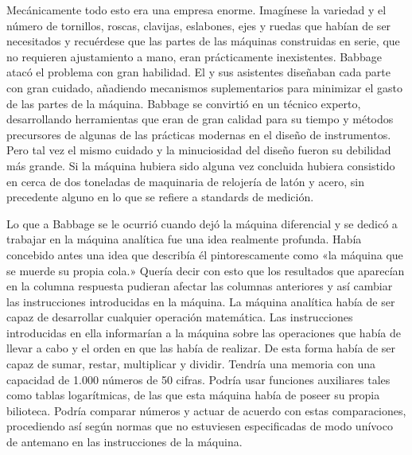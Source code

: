 \documentclass[a4paper, 12pt]{article}
\begin{document}
Mecánicamente todo esto era una empresa enorme. Imagínese la variedad y el número de tornillos, roscas, clavijas, eslabones, ejes y ruedas que habían de ser necesitados y recuérdese que las partes de las máquinas construidas en serie, que no requieren ajustamiento a mano, eran prácticamente  inexistentes. Babbage atacó el problema con gran habilidad. El y sus asistentes diseñaban cada parte con gran cuidado, añadiendo mecanismos suplementarios para minimizar el gasto de las partes de la máquina. Babbage se convirtió en un técnico experto, desarrollando herramientas que eran de gran calidad para su tiempo y métodos precursores de algunas de las prácticas modernas en el diseño de instrumentos. Pero tal vez el mismo cuidado y la minuciosidad del diseño fueron su debilidad más grande. Si la máquina hubiera sido alguna vez concluida hubiera consistido en cerca de dos toneladas de maquinaria de relojería de latón y acero, sin precedente alguno en lo que se refiere a standards de medición.

Lo que a Babbage se le ocurrió cuando dejó la máquina diferencial y se dedicó a trabajar en la máquina analítica fue una idea realmente profunda. Había concebido antes una idea que describía él pintorescamente como «la máquina que se muerde su propia cola.» Quería decir con esto que los resultados que aparecían en la columna respuesta pudieran afectar las columnas anteriores y así cambiar las instrucciones introducidas en la máquina. La máquina analítica había de ser capaz de desarrollar cualquier operación matemática. Las instrucciones introducidas en ella informarían a la máquina sobre las operaciones que había de llevar a cabo y el orden en que las había de realizar. De esta forma había de ser capaz de sumar, restar, multiplicar y dividir. Tendría una memoria con una capacidad de 1.000 números de 50 cifras. Podría usar funciones auxiliares tales como tablas logarítmicas, de las que esta máquina había de poseer su propia bilioteca. Podría comparar números y actuar de acuerdo con estas comparaciones, procediendo así según normas que no estuviesen especificadas de modo unívoco de antemano en las instrucciones de la máquina.
\end{document}
